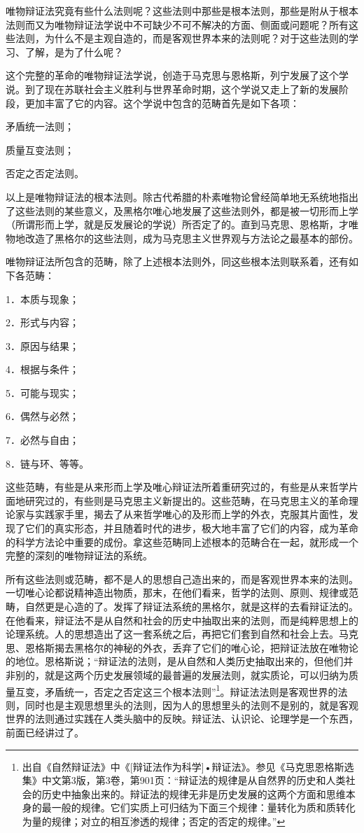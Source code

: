 \documentclass[UTF8, 12pt, a4paper]{ctexrep}
\begin{document}
唯物辩证法究竟有些什么法则呢？这些法则中那些是根本法则，那些是附从于根本法则而又为唯物辩证法学说中不可缺少不可不解决的方面、侧面或问题呢？所有这些法则，为什么不是主观自造的，而是客观世界本来的法则呢？对于这些法则的学习、了解，是为了什么呢？

这个完整的革命的唯物辩证法学说，创造于马克思与恩格斯，列宁发展了这个学说。到了现在苏联社会主义胜利与世界革命时期，这个学说又走上了新的发展阶段，更加丰富了它的内容。这个学说中包含的范畴首先是如下各项：

矛盾统一法则；

质量互变法则；

否定之否定法则。

以上是唯物辩证法的根本法则。除古代希腊的朴素唯物论曾经简单地无系统地指出了这些法则的某些意义，及黑格尔唯心地发展了这些法则外，都是被一切形而上学（所谓形而上学，就是反发展论的学说）所否定了的。直到马克思、恩格斯，才唯物地改造了黑格尔的这些法则，成为马克思主义世界观与方法论之最基本的部份。

唯物辩证法所包含的范畴，除了上述根本法则外，同这些根本法则联系着，还有如下各范畴：

1．本质与现象；

2．形式与内容；

3．原因与结果；

4．根据与条件；

5．可能与现实；

6．偶然与必然；

7．必然与自由；

8．链与环、等等。

这些范畴，有些是从来形而上学及唯心辩证法所着重研究过的，有些是从来哲学片面地研究过的，有些则是马克思主义新提出的。这些范畴，在马克思主义的革命理论家与实践家手里，揭去了从来哲学唯心的及形而上学的外衣，克服其片面性，发现了它们的真实形态，并且随着时代的进步，极大地丰富了它们的内容，成为革命的科学方法论中重要的成份。拿这些范畴同上述根本的范畴合在一起，就形成一个完整的深刻的唯物辩证法的系统。

所有这些法则或范畴，都不是人的思想自己造出来的，而是客观世界本来的法则。一切唯心论都说精神造出物质，那末，在他们看来，哲学的法则、原则、规律或范畴，自然更是心造的了。发挥了辩证法系统的黑格尔，就是这样的去看辩证法的。在他看来，辩证法不是从自然和社会的历史中抽取出来的法则，而是纯粹思想上的论理系统。人的思想造出了这一套系统之后，再把它们套到自然和社会上去。马克思、恩格斯揭去黑格尔的神秘的外衣，丢弃了它们的唯心论，把辩证法放在唯物论的地位。恩格斯说；“辩证法的法则，是从自然和人类历史抽取出来的，但他们并非别的，就是这两个历史发展领域的最普遍的发展法则，就实质论，可以归纳为质量互变，矛盾统一，否定之否定这三个根本法则”\footnote{出自《自然辩证法》中《[辩证法作为科学]•辩证法》。参见《马克思恩格斯选集》中文第3版，第3卷，第901页：“辩证法的规律是从自然界的历史和人类社会的历史中抽象出来的。辩证法的规律无非是历史发展的这两个方面和思维本身的最一般的规律。它们实质上可归结为下面三个规律：量转化为质和质转化为量的规律；对立的相互渗透的规律；否定的否定的规律。”}。辩证法法则是客观世界的法则，同时也是主观思想里头的法则，因为人的思想里头的法则不是别的，就是客观世界的法则通过实践在人类头脑中的反映。辩证法、认识论、论理学是一个东西，前面已经讲过了。
\end{document}
